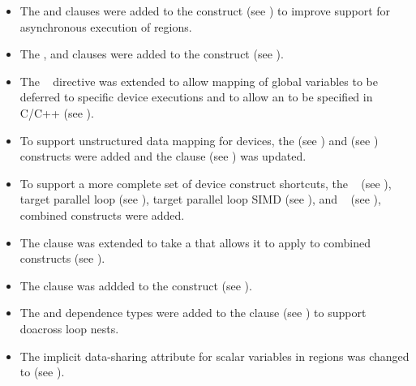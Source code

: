 \begin{itemize}
\item The  and  clauses were added to the
       construct (see )
      to improve support for asynchronous execution of  regions.

\item The ,  and  clauses
      were added to the  construct (see ).

\item The ~ directive was extended to allow
      mapping of global variables to be deferred to specific device
      executions and to allow an 
      to be specified in C/C++ (see ).

\item To support unstructured data mapping for devices, the
       (see ) and  (see ) constructs were added and the  clause
      (see ) was updated.

\item To support a more complete set of device construct shortcuts, the
      ~
      (see ),
      target parallel loop
      (see ),
      target parallel loop SIMD
      (see ),
      and ~
      (see ),
      combined constructs were added.

\item The  clause was extended to take a
       that allows it to apply
      to combined constructs (see ).

\item The  clause was addded to the  construct
      (see ).

\item The  and  dependence types were added to the
       clause (see ) to support
      doacross loop nests.

\item The implicit data-sharing attribute for scalar variables in
       regions was changed to  (see
      ).


\end{itemize}
